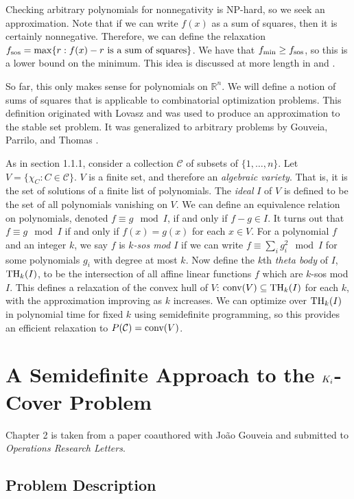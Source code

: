 Checking arbitrary polynomials for nonnegativity is NP-hard, so we seek an approximation.
Note that if we can write $f(x)$ as a sum of squares, then it is certainly nonnegative. 
Therefore, we can define the relaxation $f_{\textup{sos}} = \max \{r: f(x) - r \textup{ is a sum of squares}\}$.
We have that $f_{\min} \ge f_{\textup{sos}}$, so this is a lower bound on the minimum. 
This idea is discussed at more length in \cite{sostools} and \cite{lasserre}. 

So far, this only makes sense for polynomials on $\mathbb{R}^n$.
We will define a notion of sums of squares that is applicable to combinatorial optimization problems.
This definition originated with Lovasz \cite{lovasz} and was used to produce an approximation to the stable set problem.
It was generalized to arbitrary problems by Gouveia, Parrilo, and Thomas \cite{gpt}.

As in section 1.1.1, consider a collection $\mathcal{C}$ of subsets of $\{1, \ldots, n\}$. 
Let $V = \{\chi_C: C \in \mathcal{C}\}$.
$V$ is a finite set, and therefore an {\em algebraic variety}.
That is, it is the set of solutions of a finite list of polynomials.
The {\em ideal} $I$ of $V$ is defined to be the set of all polynomials vanishing on $V$.
We can define an equivalence relation on polynomials, denoted $f \equiv g \mod I$, if and only if $f - g \in I$.
It turns out that $f \equiv g \mod I$ if and only if $f(x) = g(x)$ for each $x \in V$.
For a polynomial $f$ and an integer $k$, we say $f$ is {\em $k$-sos mod $I$} if we can write $f \equiv \sum_i g_i^2 \mod I$ for some polynomials $g_i$ with degree at most $k$.
Now define the $k$th {\em theta body} of $I$, $\textup{TH}_k(I)$, to be the intersection of all affine linear functions $f$ which are $k$-sos mod $I$. 
This defines a relaxation of the convex hull of $V$: $\hbox{conv}(V) \subseteq \textup{TH}_k(I)$ for each $k$, with the approximation improving as $k$ increases.
We can optimize over $\textup{TH}_k(I)$ in polynomial time for fixed $k$ using semidefinite programming, so this provides an efficient relaxation to $P(\mathcal{C}) = \hbox{conv}(V)$.

\section{A Semidefinite Approach to the $K_\MakeLowercase{i}$-Cover Problem}
Chapter 2 is taken from a paper coauthored with Jo\~ao Gouveia and submitted to \emph{Operations Research Letters}. 

\subsection{Problem Description}

